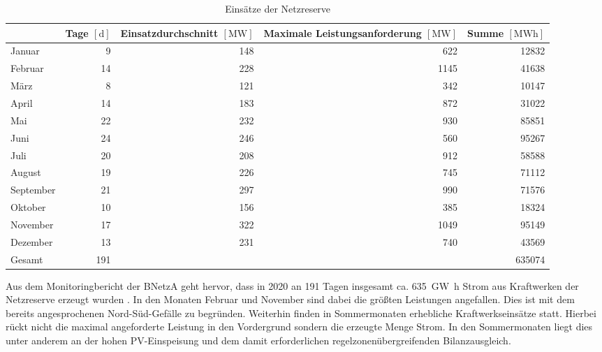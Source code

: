 			\begin{table}[H]
				\centering
				\caption{Einsätze der Netzreserve \cite[S. 158]{Monitoringbericht_BNetzA}}
				\label{Tab. Einsätze Netzreserve}
				\begin{tabular}{lrrrr}
					\hline
					& \makecell[c]{Tage \\ $\left[\si{\day}\right]$} & \makecell[c]{Einsatzdurchschnitt \\ $\left[\si{\mega\watt}\right]$} & \makecell[c]{Maximale Leistungsanforderung \\ $\left[\si{\mega\watt}\right]$} & \makecell[c]{Summe \\ $\left[\si{\mega\watt\hour}\right]$} \\ \hline
					Januar & \num{9} & \num{148} & \num{622} & \num{12832} \\
					Februar & \num{14} & \num{228} & \num{1145} & \num{41638} \\
					März & \num{8} & \num{121} & \num{342} & \num{10147} \\
					April & \num{14} & \num{183} & \num{872} & \num{31022} \\
					Mai & \num{22} & \num{232} & \num{930} & \num{85851} \\
					Juni & \num{24} & \num{246} & \num{560} & \num{95267} \\
					Juli & \num{20} & \num{208} & \num{912} & \num{58588} \\
					August & \num{19} & \num{226} & \num{745} & \num{71112} \\
					September & \num{21} & \num{297} & \num{990} & \num{71576} \\
					Oktober & \num{10} & \num{156} & \num{385} & \num{18324} \\
					November & \num{17} & \num{322} & \num{1049} & \num{95149} \\
					Dezember & \num{13} & \num{231} & \num{740} & \num{43569} \\ \hline
					Gesamt & \num{191} &  &  & \num{635074} \\ \hline
				\end{tabular}
			\end{table}
			
			Aus dem Monitoringbericht der BNetzA geht hervor, dass in 2020 an \num{191} Tagen insgesamt ca. \SI{635}{\giga\watt\hour} Strom aus Kraftwerken der Netzreserve erzeugt wurden \cite[S. 157 f.]{Monitoringbericht_BNetzA}.
			In den Monaten Februar und November sind dabei die größten Leistungen angefallen.
			Dies ist mit dem bereits angesprochenen Nord-Süd-Gefälle zu begründen.	
			Weiterhin finden in Sommermonaten erhebliche Kraftwerkseinsätze statt.
			Hierbei rückt nicht die maximal angeforderte Leistung in den Vordergrund sondern die erzeugte Menge Strom.
			In den Sommermonaten liegt dies unter anderem an der hohen PV-Einspeisung und dem damit erforderlichen regelzonenübergreifenden  Bilanzausgleich.
		    
